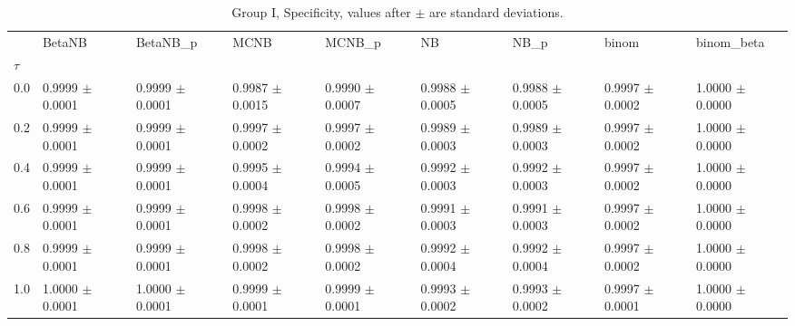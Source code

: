 \begin{table}[H]
\centering
\begin{adjustbox}{max width=\linewidth}
\begin{tabular}{lllllllll}
\toprule
 & BetaNB & BetaNB\_p & MCNB & MCNB\_p & NB & NB\_p & binom & binom\_beta \\
$\tau$ &  &  &  &  &  &  &  &  \\
\midrule
0.0 & 0.9999 $\pm$ 0.0001 & 0.9999 $\pm$ 0.0001 & 0.9987 $\pm$ 0.0015 & 0.9990 $\pm$ 0.0007 & 0.9988 $\pm$ 0.0005 & 0.9988 $\pm$ 0.0005 & 0.9997 $\pm$ 0.0002 & 1.0000 $\pm$ 0.0000 \\
0.2 & 0.9999 $\pm$ 0.0001 & 0.9999 $\pm$ 0.0001 & 0.9997 $\pm$ 0.0002 & 0.9997 $\pm$ 0.0002 & 0.9989 $\pm$ 0.0003 & 0.9989 $\pm$ 0.0003 & 0.9997 $\pm$ 0.0002 & 1.0000 $\pm$ 0.0000 \\
0.4 & 0.9999 $\pm$ 0.0001 & 0.9999 $\pm$ 0.0001 & 0.9995 $\pm$ 0.0004 & 0.9994 $\pm$ 0.0005 & 0.9992 $\pm$ 0.0003 & 0.9992 $\pm$ 0.0003 & 0.9997 $\pm$ 0.0002 & 1.0000 $\pm$ 0.0000 \\
0.6 & 0.9999 $\pm$ 0.0001 & 0.9999 $\pm$ 0.0001 & 0.9998 $\pm$ 0.0002 & 0.9998 $\pm$ 0.0002 & 0.9991 $\pm$ 0.0003 & 0.9991 $\pm$ 0.0003 & 0.9997 $\pm$ 0.0002 & 1.0000 $\pm$ 0.0000 \\
0.8 & 0.9999 $\pm$ 0.0001 & 0.9999 $\pm$ 0.0001 & 0.9998 $\pm$ 0.0002 & 0.9998 $\pm$ 0.0002 & 0.9992 $\pm$ 0.0004 & 0.9992 $\pm$ 0.0004 & 0.9997 $\pm$ 0.0002 & 1.0000 $\pm$ 0.0000 \\
1.0 & 1.0000 $\pm$ 0.0001 & 1.0000 $\pm$ 0.0001 & 0.9999 $\pm$ 0.0001 & 0.9999 $\pm$ 0.0001 & 0.9993 $\pm$ 0.0002 & 0.9993 $\pm$ 0.0002 & 0.9997 $\pm$ 0.0001 & 1.0000 $\pm$ 0.0000 \\
\bottomrule
\end{tabular}

\end{adjustbox}
\caption{Group I, Specificity, values after $\pm$ are standard deviations.}
\end{table}
